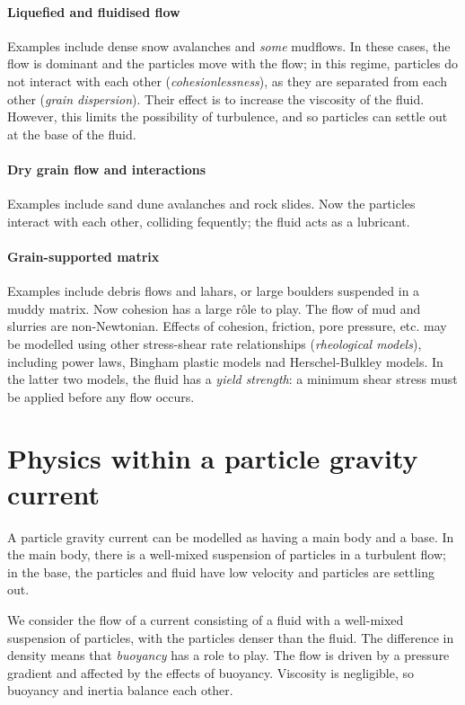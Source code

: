 \paragraph{Liquefied and fluidised flow} Examples include dense snow avalanches
and \textit{some} mudflows. In these cases, the flow is dominant and the
particles move with the flow; in this regime, particles do not interact with
each other (\textit{cohesionlessness}), as they are separated from each other
(\textit{grain dispersion}). Their effect is to increase the viscosity of the
fluid. However, this limits the possibility of turbulence, and so particles can 
settle out at the base of the fluid.

\paragraph{Dry grain flow and interactions} Examples include sand dune
avalanches and rock slides. Now the particles interact with each other,
colliding fequently; the fluid acts as a lubricant. 

\paragraph{Grain-supported matrix} Examples include debris flows and lahars, or
large boulders suspended in a muddy matrix. Now cohesion has a large r\^ole to
play. The flow of mud and slurries are non-Newtonian. Effects of cohesion,
friction, pore pressure, etc. may be modelled using other stress-shear rate
relationships (\textit{rheological models}), including power laws, Bingham
plastic models nad Herschel-Bulkley models. In the latter two models, the fluid
has a \textit{yield strength}: a minimum shear stress must be applied before any
flow occurs. 

\section{Physics within a particle gravity current}

A particle gravity current can be modelled as having a main body and a base. In
the main body, there is a well-mixed suspension of particles in a turbulent
flow; in the base, the particles and fluid have low velocity and particles are
settling out. 

We consider the flow of a current consisting of a fluid with a well-mixed
suspension of particles, with the particles denser than the fluid. The
difference in density means that \textit{buoyancy} has a role to play. The flow
is driven by a pressure gradient and affected by the effects of buoyancy.
Viscosity is negligible, so buoyancy and inertia balance each other. 

